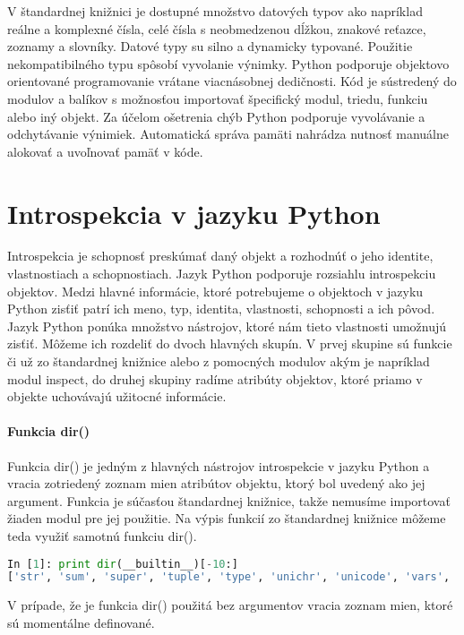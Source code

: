 \documentclass[11pt,oneside,final]{fithesis2}
\begin{document}
	V štandardnej knižnici je dostupné množstvo datových typov ako napríklad reálne a komplexné čísla, celé čísla s neobmedzenou dĺžkou, znakové reťazce, zoznamy a slovníky. Datové typy su silno a dynamicky typované. Použitie nekompatibilného typu spôsobí vyvolanie výnimky. Python podporuje objektovo orientované programovanie vrátane viacnásobnej dedičnosti. Kód je sústredený do modulov a balíkov s možnosťou importovať špecifický modul, triedu, funkciu alebo iný objekt. Za účelom ošetrenia chýb Python podporuje vyvolávanie a odchytávanie výnimiek. Automatická správa pamäti nahrádza nutnosť manuálne alokovať a uvoľnovať pamäť v kóde.


	\section{Introspekcia v jazyku Python}
		Introspekcia je schopnosť preskúmať daný objekt a rozhodnúť o jeho identite, vlastnostiach a schopnostiach. Jazyk Python podporuje rozsiahlu introspekciu objektov. Medzi hlavné informácie, ktoré potrebujeme o objektoch v jazyku Python zisťiť patrí ich meno, typ, identita, vlastnosti, schopnosti a ich pôvod. Jazyk Python ponúka množstvo nástrojov, ktoré nám tieto vlastnosti umožnujú zisťiť. Môžeme ich rozdeliť do dvoch hlavných skupín. V prvej skupine sú funkcie či už zo štandardnej knižnice alebo z pomocných modulov akým je napríklad modul inspect, do druhej skupiny radíme atribúty objektov, ktoré priamo v objekte uchovávajú užitocné informácie.
	
		\paragraph{Funkcia dir()}
			Funkcia dir() je jedným z hlavných nástrojov introspekcie v jazyku Python a vracia zotriedený zoznam mien atribútov objektu, ktorý bol uvedený ako jej argument. Funkcia je súčasťou štandardnej knižnice, takže nemusíme importovať žiaden modul pre jej použitie. Na výpis funkcií zo štandardnej knižnice môžeme teda využiť samotnú funkciu dir().
			

\begin{lstlisting}[language=python]
In [1]: print dir(__builtin__)[-10:]
['str', 'sum', 'super', 'tuple', 'type', 'unichr', 'unicode', 'vars', 'xrange', 'zip']
\end{lstlisting}

			 V prípade, že je funkcia dir() použitá bez argumentov vracia zoznam mien, ktoré sú momentálne definované.
\end{document}
